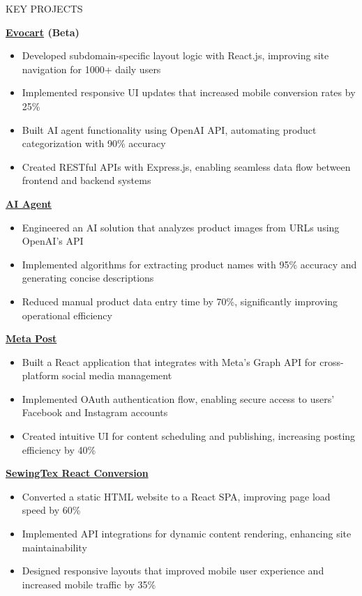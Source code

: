 \documentclass{resume} %
\begin{document}
\begin{rSection}{KEY PROJECTS}
\vspace{-1.25em}
\item \textbf{\href{https://apple.nazarahnaturals.com/}{Evocart} (Beta)} 
\begin{itemize}
    \itemsep -3pt {}
    \item Developed subdomain-specific layout logic with React.js, improving site navigation for 1000+ daily users
    \item Implemented responsive UI updates that increased mobile conversion rates by 25\%
    \item Built AI agent functionality using OpenAI API, automating product categorization with 90\% accuracy
    \item Created RESTful APIs with Express.js, enabling seamless data flow between frontend and backend systems
\end{itemize}

\item \textbf{\href{https://github.com/rafidrahman1/ai_agent}{AI Agent}}
\begin{itemize}
    \itemsep -3pt {}
    \item Engineered an AI solution that analyzes product images from URLs using OpenAI's API
    \item Implemented algorithms for extracting product names with 95\% accuracy and generating concise descriptions
    \item Reduced manual product data entry time by 70\%, significantly improving operational efficiency
\end{itemize}

\item \textbf{\href{https://github.com/rafidrahman1/meta_post}{Meta Post}}
\begin{itemize}
    \itemsep -3pt {}
    \item Built a React application that integrates with Meta's Graph API for cross-platform social media management
    \item Implemented OAuth authentication flow, enabling secure access to users' Facebook and Instagram accounts
    \item Created intuitive UI for content scheduling and publishing, increasing posting efficiency by 40\%
\end{itemize}

\item \textbf{\href{https://sewingtexapparels.com/}{SewingTex React Conversion}}
\begin{itemize}
    \itemsep -3pt {}
    \item Converted a static HTML website to a React SPA, improving page load speed by 60\%
    \item Implemented API integrations for dynamic content rendering, enhancing site maintainability
    \item Designed responsive layouts that improved mobile user experience and increased mobile traffic by 35\%
\end{itemize}


\end{rSection}
\end{document}

